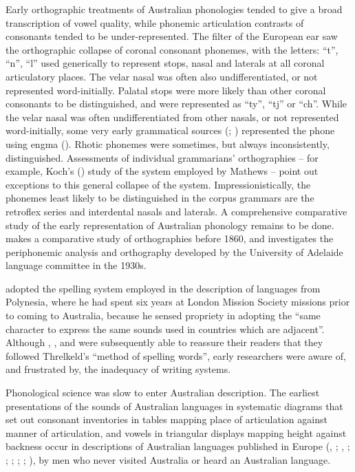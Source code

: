 \hspace*{-2.1pt}Early orthographic treatments of Australian phonologies tended to give a broad transcription of vowel quality, while phonemic articulation contrasts of consonants tended to be under-represented. The filter of the European ear saw the orthographic collapse of coronal consonant phonemes, with the letters: “t”, “n”, “l” used generically to represent stops, nasal and laterals at all coronal articulatory places. The velar nasal was often also undifferentiated, or not represented word-initially. Palatal stops were more likely than other coronal consonants to be distinguished, and were represented as “ty”, “tj” or “ch”. While the velar nasal was often undifferentiated from other nasals, or not represented word-initially, some very early grammatical sources (\citealt[1ff.]{dawes_grammatical_1790}; \citealt{hale_languages_1846}) represented the phone using engma (\ng). Rhotic phonemes were sometimes, but always inconsistently, distinguished. Assessments of individual grammarians’ orthographies -- for example, Koch’s (\citeyear[183--186]{koch_r_2008}) study of the system employed by Mathews -- point out exceptions to this general collapse of the system. Impressionistically, the phonemes least likely to be distinguished in the corpus grammars are the retroflex series and interdental nasals and laterals. A comprehensive comparative study of the early representation of Australian phonology remains to be done. \citet{newton_more_1987} makes a comparative study of orthographies before 1860, and \citet[15--17]{Stockigt2021a} investigates the periphonemic analysis and orthography developed by the University of Adelaide language committee in the 1930s.

\citet[vi]{threlkeld_australian_1834} adopted the spelling system employed in the description of languages from Polynesia, where he had spent six years at London Mission Society missions prior to coming to Australia, because he sensed propriety in adopting the “same character to express the same sounds used in countries which are adjacent”. Although \citet[v]{teichelmann_outlines_1840}, \citet[338]{gunther_lecture_1840}, and \citet[290]{ridley_kamilaroi_1856} were subsequently able to reassure their readers that they followed Threlkeld’s “method of spelling words”, early researchers were aware of, and frustrated by, the inadequacy of writing systems.

Phonological science was slow to enter Australian description. The earliest presentations of the sounds of Australian languages in systematic diagrams that set out consonant inventories in tables mapping place of articulation against manner of articulation, and vowels in triangular displays mapping height against backness occur in descriptions of Australian languages published in Europe (\citealt[64]{lepsius_allgemeine_1855}, \citeyear[226]{lepsius_standard_1863}; \citealt{muller_reise_1867}, \citeyear{muller_grundris_1882}; \citealt{planert_australische_1907}; \citeyear{planert_australische_1908}; \citealt[1]{gatti_lingua_1930}; \citealt[42, 45]{Sommerfelt_1938}; ), by men who never visited Australia or heard an Australian language. 

